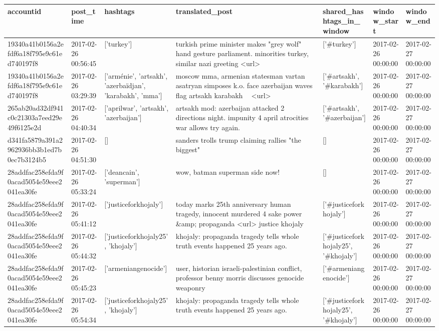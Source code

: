 \begin{tabular}{lllllll}
\toprule
accountid & post\_time & hashtags & translated\_post & shared\_hashtags\_in\_window & window\_start & window\_end \\
\midrule
19340a41b0156a2efdf6a18f795e9c61ed740197f8 & 2017-02-26 00:56:45 & ['turkey'] & turkish prime minister makes "grey wolf" hand gesture parliament. minorities turkey, similar nazi greeting <url> & ['#turkey'] & 2017-02-26 00:00:00 & 2017-02-27 00:00:00 \\
19340a41b0156a2efdf6a18f795e9c61ed740197f8 & 2017-02-26 03:29:39 & ['arménie', 'artsakh', 'azerbaïdjan', 'karabakh', 'mma'] & moscow mma, armenian statesman vartan asatryan simposes k.o. face azerbaijan waves flag artsakh karabakh 💪🏼 <url> & ['#artsakh', '#karabakh'] & 2017-02-26 00:00:00 & 2017-02-27 00:00:00 \\
265ab20ad32df941c0c21303a7eed29e49f6125e2d & 2017-02-26 04:40:34 & ['aprilwar', 'artsakh', 'azerbaijan'] & artsakh mod: azerbaijan attacked 2 directions night. impunity 4 april atrocities war allows try again. & ['#artsakh', '#azerbaijan'] & 2017-02-26 00:00:00 & 2017-02-27 00:00:00 \\
d341fa5879a391a2962936bb3b1ed7b0ec7b3124b5 & 2017-02-26 04:51:30 & [] & sanders trolls trump claiming rallies "the biggest" & [] & 2017-02-26 00:00:00 & 2017-02-27 00:00:00 \\
28addfac258efda9f0acad5054e59eee2041ea30fe & 2017-02-26 05:33:24 & ['deancain', 'superman'] & wow, batman superman side now! & [] & 2017-02-26 00:00:00 & 2017-02-27 00:00:00 \\
28addfac258efda9f0acad5054e59eee2041ea30fe & 2017-02-26 05:41:12 & ['justiceforkhojaly'] & today marks 25th anniversary human tragedy, innocent murdered 4 sake power \&amp; propaganda <url> justice khojaly & ['#justiceforkhojaly'] & 2017-02-26 00:00:00 & 2017-02-27 00:00:00 \\
28addfac258efda9f0acad5054e59eee2041ea30fe & 2017-02-26 05:44:32 & ['justiceforkhojaly25', 'khojaly'] & khojaly: propaganda tragedy tells whole truth events happened 25 years ago. & ['#justiceforkhojaly25', '#khojaly'] & 2017-02-26 00:00:00 & 2017-02-27 00:00:00 \\
28addfac258efda9f0acad5054e59eee2041ea30fe & 2017-02-26 05:45:23 & ['armeniangenocide'] & user, historian israeli-palestinian conflict, professor benny morris discusses genocide weaponry & ['#armeniangenocide'] & 2017-02-26 00:00:00 & 2017-02-27 00:00:00 \\
28addfac258efda9f0acad5054e59eee2041ea30fe & 2017-02-26 05:54:34 & ['justiceforkhojaly25', 'khojaly'] & khojaly: propaganda tragedy tells whole truth events happened 25 years ago. & ['#justiceforkhojaly25', '#khojaly'] & 2017-02-26 00:00:00 & 2017-02-27 00:00:00 \\

\end{tabular}
